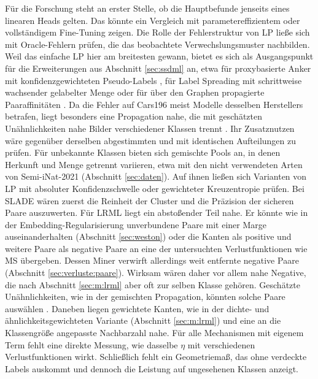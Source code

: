 Für die Forschung steht an erster Stelle, ob die Hauptbefunde jenseits eines linearen Heads gelten. Das könnte ein Vergleich mit parametereffizientem oder vollständigem Fine-Tuning zeigen. Die Rolle der Fehlerstruktur von \ac{LP} ließe sich mit Oracle-Fehlern prüfen, die das beobachtete Verwechslungsmuster nachbilden. Weil das einfache \ac{LP} hier am breitesten gewann, bietet es sich als Ausgangspunkt für die Erweiterungen aus Abschnitt \ref{sec:ssdml} an, etwa für proxybasierte Anker mit konfidenzgewichteten Pseudo-Labels \cite{zhuang_deep_2021}, für Label Spreading mit schrittweise wachsender gelabelter Menge \cite{sahito_semi-supervised_2021} oder für über den Graphen propagierte Paaraffinitäten \cite{dutta_semi-supervised_2021}. Da die Fehler auf Cars196 meist Modelle desselben Herstellers betrafen, liegt besonders eine Propagation nahe, die mit geschätzten Unähnlichkeiten nahe Bilder verschiedener Klassen trennt \cite{zhuang_deep_2023}. Ihr Zusatznutzen wäre gegenüber derselben abgestimmten \UEBL und mit identischen Aufteilungen zu prüfen. Für unbekannte Klassen bieten sich gemischte Pools an, in denen Herkunft und Menge getrennt variieren, etwa mit den nicht verwendeten Arten von Semi-iNat-2021 (Abschnitt \ref{sec:daten}). Auf ihnen ließen sich Varianten von \ac{LP} mit absoluter Konfidenzschwelle oder gewichteter Kreuzentropie prüfen. Bei \ac{SLADE} wären zuerst die Reinheit der Cluster und die Präzision der sicheren Paare auszuwerten. Für \ac{LRML} liegt ein abstoßender Teil nahe. Er könnte wie in der Embedding-Regularisierung unverbundene Paare mit einer Marge auseinanderhalten (Abschnitt \ref{sec:weston}) oder die Kanten als positive und weitere Paare als negative Paare an eine der untersuchten Verlustfunktionen wie \ac{MS} übergeben. Dessen Miner verwirft allerdings weit entfernte negative Paare (Abschnitt \ref{sec:verluste:paare}). Wirksam wären daher vor allem nahe Negative, die nach Abschnitt \ref{sec:m:lrml} aber oft zur selben Klasse gehören. Geschätzte Unähnlichkeiten, wie in der gemischten Propagation, könnten solche Paare auswählen \cite{zhuang_deep_2023}. Daneben liegen gewichtete Kanten, wie in der dichte- und ähnlichkeitsgewichteten Variante (Abschnitt \ref{sec:m:lrml}) und eine an die Klassengröße angepasste Nachbarzahl nahe. Für alle Mechanismen mit eigenem Term fehlt eine direkte Messung, wie dasselbe $\eta$ mit verschiedenen Verlustfunktionen wirkt. Schließlich fehlt ein Geometriemaß, das ohne verdeckte Labels auskommt und dennoch die Leistung auf ungesehenen Klassen anzeigt.

